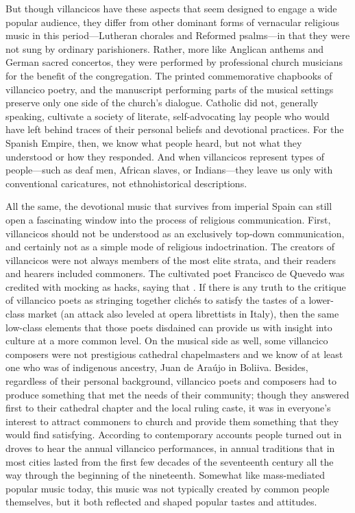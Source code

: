 But though villancicos have these aspects that seem designed to engage a wide
popular audience, they differ from other dominant forms of vernacular religious
music in this period---Lutheran chorales and Reformed psalms---in that they were
not sung by ordinary parishioners.
Rather, more like Anglican anthems and German sacred concertos, they were
performed by professional church musicians for the benefit of the congregation.
The printed commemorative chapbooks of villancico poetry, and the manuscript
performing parts of the musical settings preserve only one side of the church's
dialogue.
Catholic did not, generally speaking, cultivate a society of literate,
self-advocating lay people who would have left behind traces of their personal
beliefs and devotional practices.
For the Spanish Empire, then, we know what people heard, but not what they
understood or how they responded.%
    \Autocite{Burstyn:PeriodEar} %
And when villancicos represent types of people---such as deaf men, African
slaves, or Indians---they leave us only with conventional caricatures, not
ethnohistorical descriptions.%
    \Autocites
    {Baker:EthnicVC}
    {Baker:PerformancePostColonial}
    {Davies:LocalContent}

All the same, the devotional music that survives from imperial Spain
can still open a fascinating window into the process of religious communication.
First, villancicos should not be understood as an exclusively top-down
communication, and certainly not as a simple mode of religious indoctrination.
The creators of villancicos were not always members of the most elite strata,
and their readers and hearers included commoners.
The cultivated poet Francisco de Quevedo was credited with mocking  as hacks, saying that .%
    \Autocite[37]{Torres:SuenosMorales}
If there is any truth to the critique of villancico poets as stringing together
clichés to satisfy the tastes of a lower-class market (an attack also leveled at
opera librettists in Italy), then the same low-class elements that those poets
disdained can provide us with insight into culture at a more common level.
On the musical side as well, some villancico composers were not prestigious
cathedral chapelmasters and we know of at least one who was of indigenous
ancestry, Juan de Araújo in Boliiva.%
    \Autocite{Illari:Popular}
Besides, regardless of their personal background, villancico poets and composers
had to produce something that met the needs of their community; though they
answered first to their cathedral chapter and the local ruling caste, it was in
everyone's interest to attract commoners to church and provide them something
that they would find satisfying.
According to contemporary accounts people turned out in droves to hear the
annual villancico performances, in annual traditions that in most cities lasted
from the first few decades of the seventeenth century all the way through the
beginning of the nineteenth.
Somewhat like mass-mediated popular music today, this music was not typically
created by common people themselves, but it both reflected and shaped popular
tastes and attitudes.

